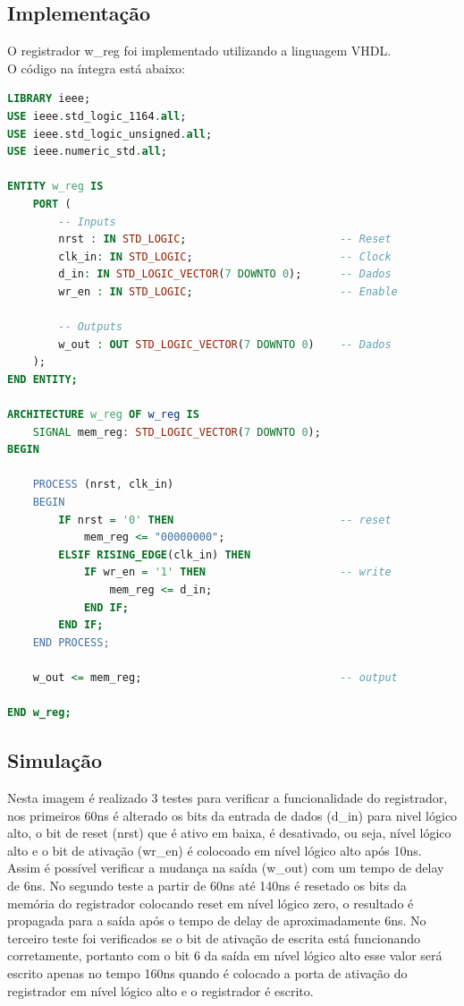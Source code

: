\documentclass{article}
\begin{document}
\subsection{Implementação}

O registrador w\_reg foi implementado utilizando a linguagem VHDL.\\

O código na íntegra está abaixo:\\

\begin{lstlisting}[language=VHDL, caption={Código VHDL w\_reg}]
LIBRARY ieee;
USE ieee.std_logic_1164.all;
USE ieee.std_logic_unsigned.all;
USE ieee.numeric_std.all;

ENTITY w_reg IS
    PORT (
        -- Inputs
        nrst : IN STD_LOGIC;                        -- Reset
        clk_in: IN STD_LOGIC;                       -- Clock
        d_in: IN STD_LOGIC_VECTOR(7 DOWNTO 0);      -- Dados
        wr_en : IN STD_LOGIC;                       -- Enable

        -- Outputs
        w_out : OUT STD_LOGIC_VECTOR(7 DOWNTO 0)    -- Dados
    );
END ENTITY;

ARCHITECTURE w_reg OF w_reg IS
    SIGNAL mem_reg: STD_LOGIC_VECTOR(7 DOWNTO 0);
BEGIN

    PROCESS (nrst, clk_in)
    BEGIN
        IF nrst = '0' THEN                          -- reset
            mem_reg <= "00000000";
        ELSIF RISING_EDGE(clk_in) THEN
            IF wr_en = '1' THEN                     -- write
                mem_reg <= d_in;
            END IF;
        END IF;
    END PROCESS;

    w_out <= mem_reg;                               -- output

END w_reg;
\end{lstlisting}

\subsection{Simulação}

Nesta imagem é realizado 3 testes para verificar a funcionalidade do registrador, nos primeiros 60ns é alterado os bits da entrada de dados (d\_in) para nivel lógico alto, o bit de reset (nrst) que é ativo em baixa, é desativado, ou seja, nível lógico alto e o bit de ativação (wr\_en) é colocoado em nível lógico alto após 10ns. Assim é possível verificar a mudança na saída (w\_out) com um tempo de delay de 6ns. No segundo teste a partir de 60ns até 140ns é resetado os bits da memória do registrador colocando reset em nível lógico zero, o resultado é propagada para a saída após o tempo de delay de aproximadamente 6ns. No terceiro teste foi verificados se o bit de ativação de escrita está funcionando corretamente, portanto com o bit 6 da saída em nível lógico alto esse valor será escrito apenas no tempo 160ns quando é colocado a porta de ativação do registrador em nível lógico alto e o registrador é escrito.
\end{document}
